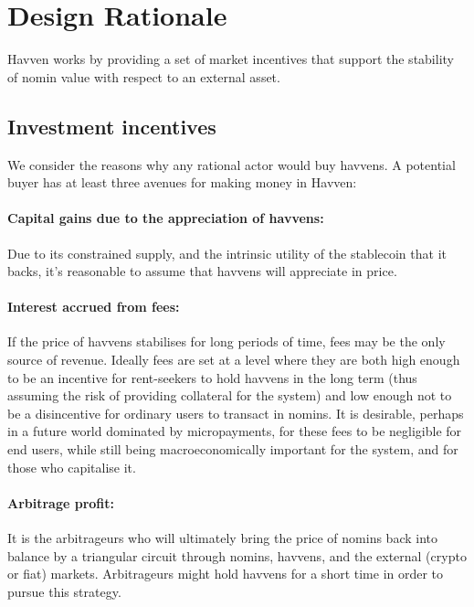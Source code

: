 \section{Design Rationale}

Havven works by providing a set of market incentives that support the stability of nomin value with respect to an external asset.


\subsection{Investment incentives}

We consider the reasons why any rational actor would buy havvens. A potential buyer has at least three avenues for making money in Havven:

\paragraph{Capital gains due to the appreciation of havvens:}
Due to its constrained supply, and the intrinsic utility of the stablecoin that it backs, it's reasonable to assume that
havvens will appreciate in price.

\paragraph{Interest accrued from fees:}
If the price of havvens stabilises for long periods of time, fees may be the only source of revenue. Ideally fees are set at a level where they are both high enough to be an incentive for rent-seekers to hold havvens in the long term (thus assuming the risk of providing collateral for the system) and low enough not to be a disincentive for ordinary users to transact in nomins.
It is desirable, perhaps in a future world dominated by micropayments, for these fees to be negligible for end users, while still being macroeconomically important for the system, and for those who capitalise it.

\paragraph{Arbitrage profit:}
It is the arbitrageurs who will ultimately bring the price of nomins back into balance by a triangular circuit through nomins, havvens, and the external (crypto or fiat) markets. Arbitrageurs might hold havvens for a short time in order to pursue this strategy.


